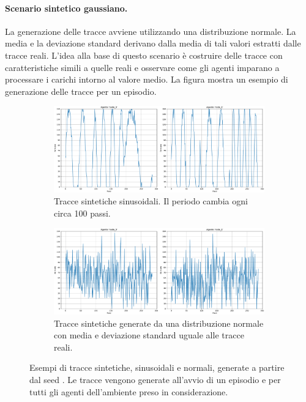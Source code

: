 \paragraph{Scenario sintetico gaussiano.} La generazione delle tracce avviene utilizzando una distribuzione normale. La media e la deviazione standard derivano dalla media di tali valori estratti dalle tracce reali. L'idea alla base di questo scenario è costruire delle tracce con caratteristiche simili a quelle reali e osservare come gli agenti imparano a processare i carichi intorno al valore medio. La figura  mostra un esempio di generazione delle tracce per un episodio.

\begin{figure}
    \centering

    \begin{subfigure}{\textwidth}
        \centering
        \includegraphics[width=\linewidth]{assets/5/requests_sinusoidal_64423.pdf}
        \caption{Tracce sintetiche sinusoidali. Il periodo cambia ogni circa 100 passi.}
        \label{fig:5_sinthetic_traces_sin_64423}
    \end{subfigure}

    \begin{subfigure}{\textwidth}
        \centering
        \includegraphics[width=\linewidth]{assets/5/requests_normal_64423.pdf}
        \caption{Tracce sintetiche generate da una distribuzione normale con media e deviazione standard uguale alle tracce reali.}
        \label{fig:5_sinthetic_traces_norm_64423}
    \end{subfigure}
    
    \caption[Esempi di tracce sintetiche]{Esempi di tracce sintetiche, sinusoidali e normali, generate a partire dal seed . Le tracce vengono generate all'avvio di un episodio e per tutti gli agenti dell'ambiente preso in considerazione.}
    \label{fig:5_sinthetic_traces}
\end{figure}

